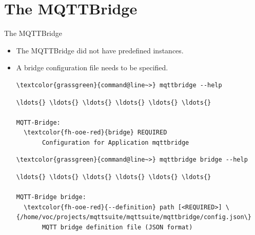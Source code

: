 ﻿\section[withsectionpage]{The MQTTBridge}

\begin{frame}[fragile]{The MQTTBridge}
\begin{itemize}
\item The MQTTBridge did not have predefined instances.
\item A bridge configuration file needs to be specified.
\begin{footnotesize}
\begin{Verbatim}[commandchars=\\\{\}]
\textcolor{grassgreen}{command@line~>} mqttbridge --help
\end{Verbatim}
\begin{Verbatim}[commandchars=\\\{\},frame=leftline,rulecolor=\color{fh-ooe-red}]
\ldots{} \ldots{} \ldots{} \ldots{} \ldots{} \ldots{}

MQTT-Bridge:
  \textcolor{fh-ooe-red}{bridge} REQUIRED
       Configuration for Application mqttbridge
\end{Verbatim}
\vspace{1em}
\begin{Verbatim}[commandchars=\\\{\}]
\textcolor{grassgreen}{command@line~>} mqttbridge bridge --help
\end{Verbatim}
\begin{Verbatim}[commandchars=\\\{\},frame=leftline,rulecolor=\color{fh-ooe-red}]
\ldots{} \ldots{} \ldots{} \ldots{} \ldots{} \ldots{}

MQTT-Bridge bridge:
  \textcolor{fh-ooe-red}{--definition} path [<REQUIRED>] \{/home/voc/projects/mqttsuite/mqttsuite/mqttbridge/config.json\}
       MQTT bridge definition file (JSON format)
\end{Verbatim}
\end{footnotesize}
\end{itemize}
\end{frame}
